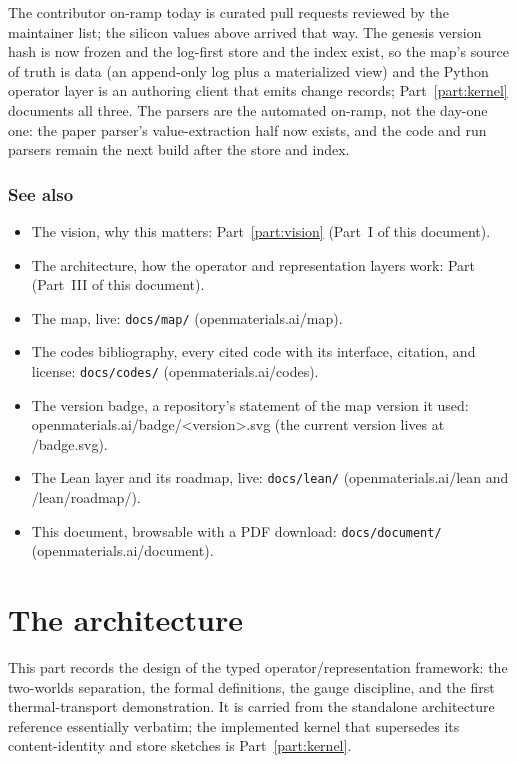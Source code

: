 \documentclass[11pt,a4paper]{article}
\begin{document}
The contributor on-ramp today is curated pull requests reviewed by the
maintainer list; the silicon values above arrived that way. The genesis
version hash is now frozen and the log-first store and the index exist, so the
map's source of truth is data (an append-only log plus a materialized view) and
the Python operator layer is an authoring client that emits change records;
Part~\ref{part:kernel} documents all three. The parsers are the automated
on-ramp, not the day-one one: the paper parser's value-extraction half now
exists, and the code and run parsers remain the next build after the store and
index.

\section*{See also}

\begin{itemize}[leftmargin=2em]
  \item The vision, why this matters: Part~\ref{part:vision} (Part~I of this document).
  \item The architecture, how the operator and representation layers work:
  Part~\ref{part:architecture} (Part~III of this document).
  \item The map, live: \texttt{docs/map/} (openmaterials.ai/map).
  \item The codes bibliography, every cited code with its interface, citation,
  and license: \texttt{docs/codes/} (openmaterials.ai/codes).
  \item The version badge, a repository's statement of the map version it
  used: openmaterials.ai/badge/\textless{}version\textgreater{}.svg (the
  current version lives at /badge.svg).
  \item The Lean layer and its roadmap, live: \texttt{docs/lean/}
  (openmaterials.ai/lean and /lean/roadmap/).
  \item This document, browsable with a PDF download:
  \texttt{docs/document/} (openmaterials.ai/document).
\end{itemize}

\part{The architecture}
\label{part:architecture}

\noindent This part records the design of the typed operator/representation
framework: the two-worlds separation, the formal definitions, the gauge
discipline, and the first thermal-transport demonstration. It is carried from
the standalone architecture reference essentially verbatim; the implemented
kernel that supersedes its content-identity and store sketches is
Part~\ref{part:kernel}.
\end{document}
